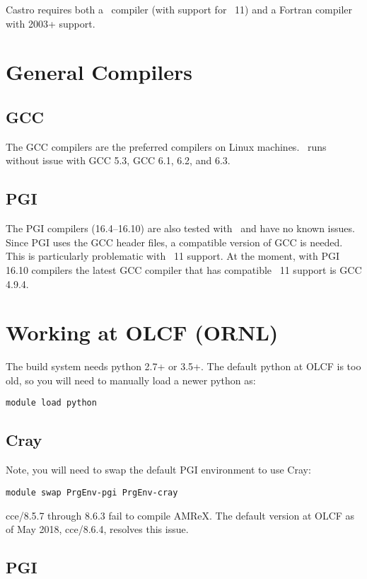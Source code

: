 Castro requires both a \cpp\ compiler (with support for \cpp\ 11) and
a Fortran compiler with 2003+ support.

\section{General Compilers}

\subsection{GCC}
The GCC compilers are the preferred compilers on Linux machines.
\castro\ runs without issue with GCC 5.3, GCC 6.1, 6.2, and 6.3.

\subsection{PGI}

The PGI compilers (16.4--16.10) are also tested with \castro\ and have
no known issues.  Since PGI uses the GCC header files, a compatible
version of GCC is needed.  This is particularly problematic with \cpp~11
support.  At the moment, with PGI 16.10 compilers the latest GCC compiler
that has compatible \cpp~11 support is GCC 4.9.4.

\section{Working at OLCF (ORNL)}

The build system needs python 2.7+ or 3.5+.  The default python at OLCF
is too old, so you will need to manually load a newer python as:
\begin{verbatim}
module load python
\end{verbatim}

\subsection{Cray}
Note, you will need to swap the default PGI environment to use Cray:
\begin{verbatim}
module swap PrgEnv-pgi PrgEnv-cray
\end{verbatim}

cce/8.5.7 through 8.6.3 fail to compile AMReX. The default version at OLCF as of May 2018,
cce/8.6.4, resolves this issue.

\subsection{PGI}

